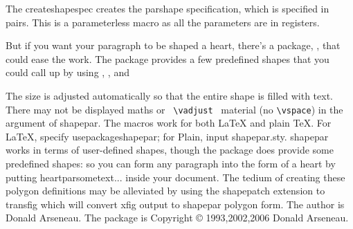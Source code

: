 \begin{teX}
\def\prune#1#2{ %
\unvbox#1 \setbox#1=\lastbox %
\setbox#1=\hbox to#2{\strut\unhbox#l\unskip}
}
\end{teX}

The createshapespec creates the parshape specification, which is specified in pairs. This
is a parameterless macro as all the parameters are in registers. 
\begin{teX}
\def\createparshapespec{%
\n=\l \multiply \n by2 \advance\n by\d \advance\n by1
\loop\a=\expandafter{\the\a 0pt \hsize}\advance\d-1
\ifnum\d>0\repeat
\loop\a=\expandafter{\the\a 0pt \lefttside 0pt \rtside}\advance\l-1
\ifnum\l>0\repeat
\a=\expandafter{\the\a 0pt \hsize}
}
%
\def\computeilg{%
\ilg=\baselineskip
\setbox0=\hbox{(}\advance\ilg-\ht0 \advance\ilg-\dp0
}
\egroup

\end{teX}


But if you want your paragraph to be shaped a heart, there's a package, , that
could ease the work. The package provides a few predefined shapes that you could call
up by using , , and 

The size is adjusted automatically so that the entire shape is filled with text. There may not be displayed maths or \verb+ \vadjust +  material (no \verb+\vspace+) in the argument of shapepar. The macros work for both LaTeX and plain TeX. For LaTeX, specify usepackage{shapepar}; for Plain, input shapepar.sty.
shapepar works in terms of user-defined shapes, though the package does provide some predefined shapes: so you can form any paragraph into the form of a heart by putting heartpar{sometext...} inside your document. The tedium of creating these polygon definitions may be alleviated by using the shapepatch extension to transfig which will convert xfig output to shapepar polygon form.
The author is Donald Arseneau. The package is Copyright  © 1993,2002,2006 Donald Arseneau.



\newcommand{\abc}{abcdefghijklmnopqrstuvwxyz}

